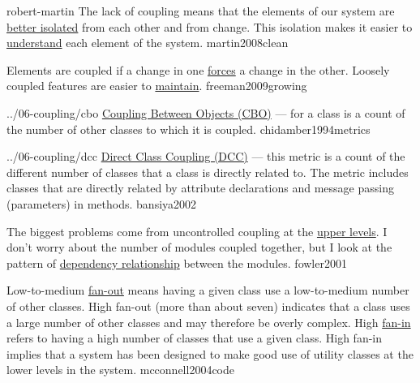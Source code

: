 \documentclass{article}
\begin{document}
\lnQuote
  {robert-martin}
  {The lack of coupling means that the elements of our system are \ul{better isolated} from each other and from change. This isolation makes it easier to \ul{understand} each element of the system.}
  {martin2008clean}

  {Elements are coupled if a change in one \ul{forces} a change in the other. Loosely coupled features are easier to \ul{maintain}.}
  {freeman2009growing}

\lnQuote
  {../06-coupling/cbo}
  {\ul{Coupling Between Objects (CBO)} --- for a class is a count of the number of other classes to which it is coupled.}
  {chidamber1994metrics}

\lnQuote
  {../06-coupling/dcc}
  {\ul{Direct Class Coupling (DCC)} --- this metric is a count of the different number of classes that a class is directly related to. The metric includes classes that are directly related by attribute declarations and message passing (parameters) in methods.}
  {bansiya2002}

  {The biggest problems come from uncontrolled coupling at the \ul{upper levels}. I don't worry about the number of modules coupled together, but I look at the pattern of \ul{dependency relationship} between the modules.}
  {fowler2001}

  {Low-to-medium \ul{fan-out} means having a given class use a low-to-medium number of other classes. High fan-out (more than about seven) indicates that a class uses a large number of other classes and may therefore be overly complex. High \ul{fan-in} refers to having a high number of classes that use a given class. High fan-in implies that a system has been designed to make good use of utility classes at the lower levels in the system.}
  {mcconnell2004code}


\end{document}
